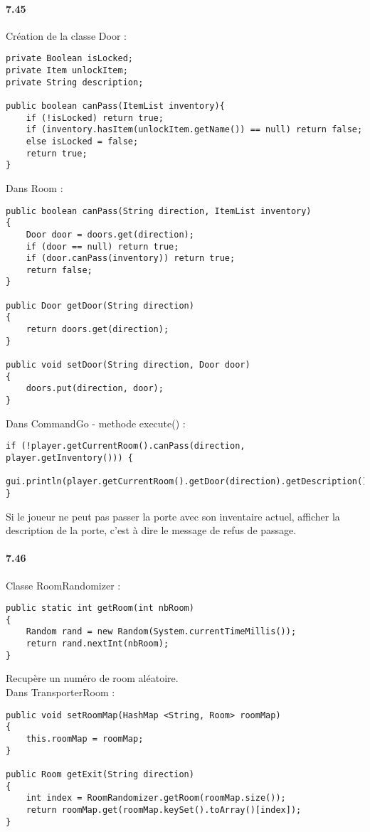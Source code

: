 \documentclass[11pt,a4paper]{report}
\begin{document}
\paragraph{7.45}
Création de la classe Door :
\begin{lstlisting}
private Boolean isLocked;
private Item unlockItem;
private String description;

public boolean canPass(ItemList inventory){
    if (!isLocked) return true;
    if (inventory.hasItem(unlockItem.getName()) == null) return false;
    else isLocked = false;
    return true;
}
\end{lstlisting}
Dans Room :
\begin{lstlisting}
public boolean canPass(String direction, ItemList inventory)
{
    Door door = doors.get(direction);
    if (door == null) return true;
    if (door.canPass(inventory)) return true;
    return false;
}

public Door getDoor(String direction)
{
    return doors.get(direction);
}

public void setDoor(String direction, Door door)
{
    doors.put(direction, door);
}
\end{lstlisting}
Dans CommandGo - methode execute() :
\begin{lstlisting}
if (!player.getCurrentRoom().canPass(direction, player.getInventory())) {
    gui.println(player.getCurrentRoom().getDoor(direction).getDescription());
}
\end{lstlisting}
Si le joueur ne peut pas passer la porte avec son inventaire actuel, afficher la description de la porte, c'est à dire le message de refus de passage.

\paragraph{7.46}
Classe RoomRandomizer :
\begin{lstlisting}
public static int getRoom(int nbRoom)
{
    Random rand = new Random(System.currentTimeMillis());
    return rand.nextInt(nbRoom);
}
\end{lstlisting}
Recupère un numéro de room aléatoire.\\
Dans TransporterRoom :
\begin{lstlisting}
public void setRoomMap(HashMap <String, Room> roomMap)
{
    this.roomMap = roomMap;
}

public Room getExit(String direction)
{
    int index = RoomRandomizer.getRoom(roomMap.size());
    return roomMap.get(roomMap.keySet().toArray()[index]);
}
\end{lstlisting}
\end{document}
